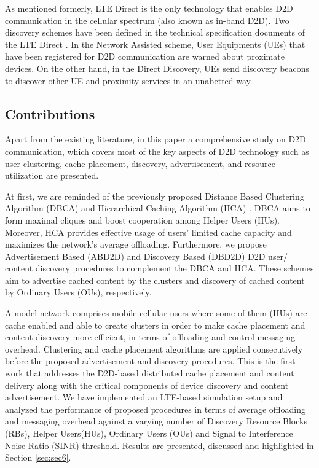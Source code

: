 \documentclass[10pt,a4paper,twocolumn]{article}
\begin{document}
As mentioned formerly, LTE Direct is the only technology that enables D2D communication in the cellular spectrum (also known as in-band D2D). Two discovery schemes have been defined in the technical specification documents of the LTE Direct \cite{TSLTEDirect}. In the Network Assisted scheme, User Equipments (UEs) that have been registered for D2D communication are warned about proximate devices. On the other hand, in the Direct Discovery, UEs send discovery beacons to discover other UE and proximity services in an unabetted way.

\subsection{Contributions}
\label{ssec:ssec1.2}
Apart from the existing literature, in this paper a comprehensive study on D2D communication, which covers most of the key aspects of D2D technology such as user clustering, cache placement, discovery, advertisement, and resource utilization are presented.

At first, we are reminded of the previously proposed Distance Based Clustering Algorithm (DBCA) and Hierarchical Caching Algorithm (HCA) \cite{Kazez2019Clustering, KazezMobility2019}. DBCA aims to form maximal cliques and boost cooperation among Helper Users (HUs). Moreover, HCA provides effective usage of users' limited cache capacity and maximizes the network's average offloading. Furthermore, we propose Advertisement Based (ABD2D) and Discovery Based (DBD2D) D2D user/ content discovery  procedures to complement the DBCA and HCA. These schemes aim to advertise cached content by the clusters and discovery of cached content by Ordinary Users (OUs), respectively.

A model network comprises mobile cellular users where some of them (HUs) are cache enabled and able to create clusters in order to make cache placement and content discovery more efficient, in terms of offloading and control messaging overhead. Clustering and cache placement algorithms are applied consecutively before the proposed advertisement and discovery procedures. This is the first work that addresses the D2D-based distributed cache placement and content delivery along with the critical components of device discovery and content advertisement. We have implemented an LTE-based simulation setup and  analyzed the performance of proposed procedures in terms of average offloading and messaging overhead against a varying number of Discovery Resource Blocks (RBs), Helper Users(HUs), Ordinary Users (OUs) and Signal to Interference Noise Ratio (SINR) threshold. Results are presented, discussed and highlighted in Section \ref{sec:sec6}.
\end{document}
